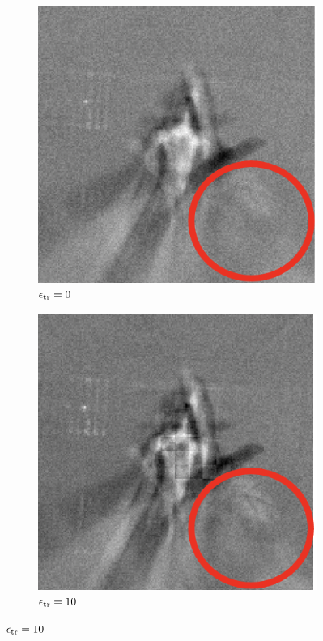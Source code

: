  \newpage
\begin{figure}[!ht]
\centering
\begin{subfigure}{0.31\textwidth}
    \centering
    \includegraphics[width=.80\linewidth]{plotsAistats/natural_log_regr_result.png}
    \caption{$\epsilon_{\text{tr}} = 0 $}
    \label{fig:log_natural}
\end{subfigure}
\begin{subfigure}{0.31\textwidth}
    \centering
    \includegraphics[width=.80\linewidth]{plotsAistats/perTrain10logisticReg.png}
    \caption{$\epsilon_{\text{tr}} = 10 $}
    \label{fig:log_e10}
\end{subfigure}

\end{figure}
